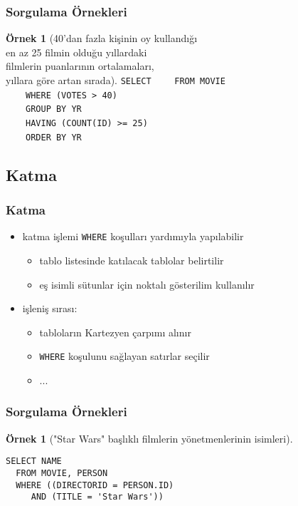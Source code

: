 \documentclass[dvipsnames]{beamer}
\theoremstyle{definition}
\theoremstyle{example}
\newtheorem{ornek}[theorem]{Örnek}
\theoremstyle{plain}
\begin{document}
\begin{frame}[fragile]
  \frametitle{Sorgulama Örnekleri}

  \begin{ornek}[40'dan fazla kişinin oy kullandığı\\
                en az 25 filmin olduğu yıllardaki\\
                filmlerin puanlarının ortalamaları,\\
                yıllara göre artan sırada]
\lstinline!SELECT! 
~~~~\lstinline!FROM MOVIE!\\
\pause
~~~~\lstinline!WHERE (VOTES > 40)!\\
\pause
~~~~\lstinline!GROUP BY YR!\\
\pause
~~~~\lstinline!HAVING (COUNT(ID) >= 25)!\\
\pause\pause
~~~~\lstinline!ORDER BY YR!
  \end{ornek}
\end{frame}

\subsection{Katma}

\begin{frame}
  \frametitle{Katma}

  \begin{itemize}
    \item katma işlemi \lstinline!WHERE! koşulları yardımıyla yapılabilir
    \begin{itemize}
      \item tablo listesinde katılacak tablolar belirtilir
      \item eş isimli sütunlar için noktalı gösterilim kullanılır
    \end{itemize}

    \pause
    \item işleniş sırası:
    \begin{itemize}
      \item tabloların Kartezyen çarpımı alınır
      \item \lstinline!WHERE! koşulunu sağlayan satırlar seçilir
      \item ...
    \end{itemize}
  \end{itemize}
\end{frame}

\begin{frame}[fragile]
  \frametitle{Sorgulama Örnekleri}

  \begin{ornek}["Star Wars" başlıklı filmlerin yönetmenlerinin isimleri]
    \begin{lstlisting}
SELECT NAME
  FROM MOVIE, PERSON
  WHERE ((DIRECTORID = PERSON.ID)
     AND (TITLE = 'Star Wars'))
    \end{lstlisting}
  \end{ornek}
\end{frame}
\end{document}
